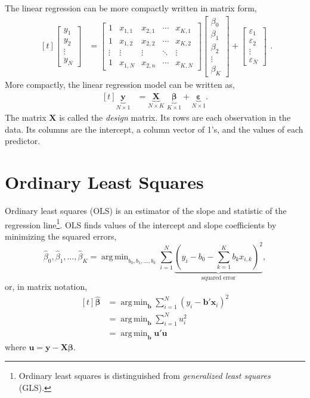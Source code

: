\documentclass[]{book}
\let\rmarkdownfootnote\footnote%
\def\footnote{\protect\rmarkdownfootnote}
\DeclareMathOperator*{\argmin}{arg\,min}
\newcommand{\mat}[1]{\boldsymbol{#1}}
\renewcommand{\vec}[1]{\boldsymbol{#1}}
\renewcommand{\T}{'}
\begin{document}
The linear regression can be more compactly written in matrix form, \[
\begin{aligned}[t]
  \begin{bmatrix}
    y_1 \\
    y_2 \\
    \vdots \\
    y_N
  \end{bmatrix} &=
  \begin{bmatrix}
    1 & x_{1,1} & x_{2,1} & \cdots & x_{K,1} \\
    1 & x_{1,2} & x_{2,2} & \cdots & x_{K,2} \\
    \vdots & \vdots & \vdots & \ddots & \vdots \\
    1 & x_{1,N}& x_{2,n} & \cdots & x_{K,N}
  \end{bmatrix}
  \begin{bmatrix}
    \beta_0 \\
    \beta_1 \\
    \beta_2 \\
    \vdots \\
    \beta_K
    \end{bmatrix}
  +
  \begin{bmatrix}
    \varepsilon_1 \\
    \varepsilon_2 \\
    \vdots \\
    \varepsilon_N
  \end{bmatrix}
\end{aligned} .
\] More compactly, the linear regression model can be written as, \[
\begin{aligned}[t]
  \underbrace{\vec{y}}_{N \times 1} &=
  \underbrace{\mat{X}}_{N \times K} \,\,
  \underbrace{\vec{\beta}}_{K \times 1} +
  \underbrace{\vec{\varepsilon}}_{N \times 1} .
\end{aligned}
\] The matrix \(\mat{X}\) is called the \emph{design} matrix. Its rows
are each observation in the data. Its columns are the intercept, a
column vector of 1's, and the values of each predictor.

\section{Ordinary Least Squares}\label{ordinary-least-squares}

Ordinary least squares (OLS) is an estimator of the slope and statistic
of the regression line\footnote{Ordinary least squares is distinguished
  from \emph{generalized least squares} (GLS).}. OLS finds values of the
intercept and slope coefficients by minimizing the squared errors, \[
\hat{\beta}_0, \hat{\beta}_1, \dots, \hat{\beta}_K
=
\argmin_{b_0, b_1, \dots, b_k} \sum_{i = 1}^{N}  \underbrace{{\left(y_i - b_0 - \sum_{k = 1}^{K} b_k x_{i,k} \right)}^2}_{\text{squared error}},
\] or, in matrix notation, \[
\begin{aligned}[t]
\hat{\vec{\beta}} &= \argmin_{\vec{b}} \sum_{i = 1}^N (y_i - \vec{b}\T \vec{x}_i)^2 \\
&= \argmin_{\vec{b}} \sum_{i = 1}^N u_i^2 \\
&= \argmin_{\vec{b}} \vec{u}' \vec{u}
\end{aligned}
\] where \(\vec{u} = \vec{y} - \mat{X} \vec{\beta}\).
\end{document}
